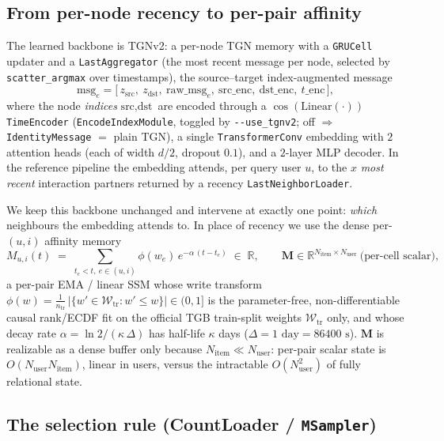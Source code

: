 \documentclass[11pt]{article}
\begin{document}
\subsection{From per-node recency to per-pair affinity}

The learned backbone is TGNv2: a per-node TGN memory with a \texttt{GRUCell} updater and a \texttt{LastAggregator} (the most recent message per node, selected by \texttt{scatter\_argmax} over timestamps), the source--target index-augmented message
\begin{equation}
\mathrm{msg}_e = \big[\, z_{\text{src}},\ z_{\text{dst}},\ \mathrm{raw\_msg}_e,\ \mathrm{src\_enc},\ \mathrm{dst\_enc},\ t\text{\_enc} \,\big],
\end{equation}
where the node \emph{indices} $\text{src},\text{dst}$ are encoded through a $\cos(\mathrm{Linear}(\cdot))$ \texttt{TimeEncoder} (\texttt{EncodeIndexModule}, toggled by \texttt{-{}-use\_tgnv2}; off $\Rightarrow$ \texttt{IdentityMessage} $=$ plain TGN), a single \texttt{TransformerConv} embedding with $2$ attention heads (each of width $d/2$, dropout $0.1$), and a $2$-layer MLP decoder. In the reference pipeline the embedding attends, per query user $u$, to the $x$ \emph{most recent} interaction partners returned by a recency \texttt{LastNeighborLoader}.

We keep this backbone unchanged and intervene at exactly one point: \emph{which} neighbours the embedding attends to. In place of recency we use the dense per-$(u,i)$ affinity memory
\begin{equation}
M_{u,i}(t) \;=\; \sum_{t_e < t,\ e\in(u,i)} \phi(w_e)\, e^{-\alpha\,(t - t_e)}
\;\in\;\mathbb{R},
\qquad
\mathbf{M}\in\mathbb{R}^{N_{\text{item}}\times N_{\text{user}}}\ \text{(per-cell scalar)},
\end{equation}
a per-pair EMA / linear SSM whose write transform $\phi(w)=\tfrac{1}{n_{\mathrm{tr}}}\,|\{w'\in\mathcal{W}_{\mathrm{tr}}: w'\le w\}|\in(0,1]$ is the parameter-free, non-differentiable causal rank/ECDF fit on the official TGB train-split weights $\mathcal{W}_{\mathrm{tr}}$ only, and whose decay rate $\alpha=\ln 2/(\kappa\,\Delta)$ has half-life $\kappa$ days ($\Delta=1\text{ day}=86400\text{ s}$). $\mathbf{M}$ is realizable as a dense buffer only because $N_{\text{item}}\ll N_{\text{user}}$: per-pair scalar state is $O(N_{\text{user}}N_{\text{item}})$, linear in users, versus the intractable $O(N_{\text{user}}^2)$ of fully relational state.

\subsection{The selection rule (CountLoader / \texttt{MSampler})}
\end{document}

